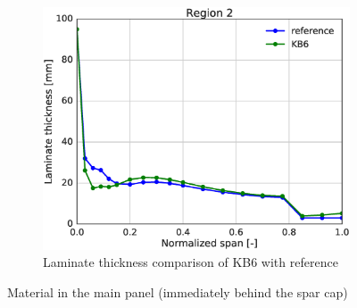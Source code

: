 \begin{figure}[tph]
\begin{subfigure}{\textwidth}
\centering
\includegraphics[width=0.50\linewidth]{figures/KB6_final/KB6_r02_thickness.eps}
\caption{Laminate thickness comparison of KB6 with reference}
\label{subfig:KB6_thick_r02}
\end{subfigure}
\caption{ Material in the main panel (immediately behind the spar cap)}
\label{fig:KB6_mat_r02}
\end{figure}


